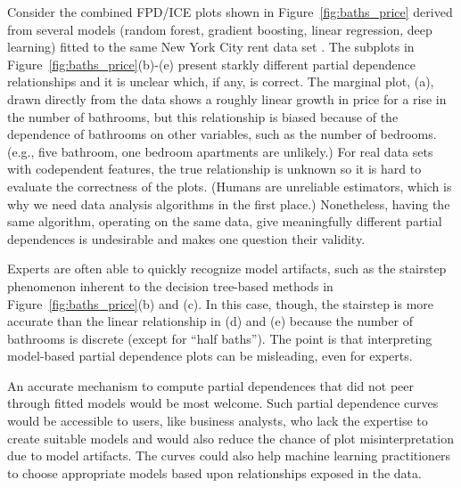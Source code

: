\documentclass[smallextended]{svjour3}       %
\newcommand{\figref}[1]{Figure~\ref{#1}}
\begin{document}
Consider the combined FPD/ICE plots shown in \figref{fig:baths_price} derived from several models (random forest, gradient boosting, linear regression, deep learning) fitted to the same New York City rent data set \cite{rent}.  The subplots in \figref{fig:baths_price}(b)-(e)  present starkly different partial dependence relationships and it is unclear which, if any, is correct.  The marginal plot, (a), drawn directly from the data shows a roughly linear growth in price for a rise in the number of bathrooms, but this relationship is biased because of the dependence of bathrooms on other variables, such as the number of bedrooms. (e.g., five bathroom, one bedroom apartments are unlikely.)  For real data sets with codependent features, the true relationship is unknown so it is hard to evaluate the correctness of the plots. (Humans are unreliable estimators, which is why we need data analysis algorithms in the first place.) Nonetheless, having the same algorithm, operating on the same data, give meaningfully different partial dependences is undesirable and makes one question their validity.

Experts are often able to quickly recognize model artifacts, such as the stairstep phenomenon inherent to the decision tree-based methods in \figref{fig:baths_price}(b) and (c).  In this case, though, the stairstep is more accurate than the linear relationship in (d) and (e) because the number of bathrooms is discrete (except for ``half baths'').  The point is that interpreting model-based partial dependence plots can be misleading, even for experts. 

An accurate mechanism to compute partial dependences that did not peer through fitted models would be most welcome.  Such partial dependence curves would be accessible to users, like business analysts, who lack the expertise to create suitable models and would also reduce the chance of plot misinterpretation due to model artifacts. The curves could also help machine learning practitioners to choose appropriate models based upon relationships exposed in the data.
\end{document}
